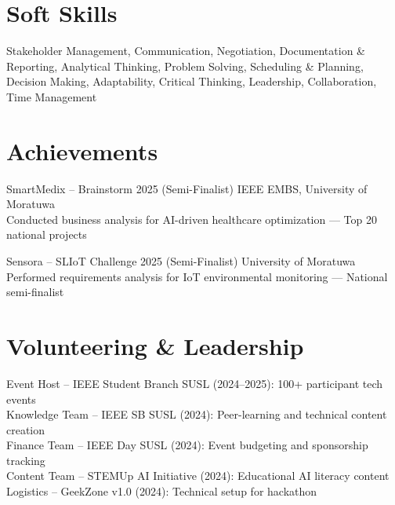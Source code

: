 \documentclass[letterpaper,12pt]{article}
\begin{document}
\section{Soft Skills}
\vspace{-1pt}
Stakeholder Management, Communication, Negotiation, Documentation \& Reporting, Analytical Thinking, Problem Solving, Scheduling \& Planning, Decision Making, Adaptability, Critical Thinking, Leadership, Collaboration, Time Management

\section{Achievements}
\vspace{-1pt}

SmartMedix – Brainstorm 2025 (Semi-Finalist) \hfill IEEE EMBS, University of Moratuwa\\
Conducted business analysis for AI-driven healthcare optimization — Top 20 national projects

\vspace{5pt}
\noindent Sensora – SLIoT Challenge 2025 (Semi-Finalist) \hfill University of Moratuwa\\
Performed requirements analysis for IoT environmental monitoring — National semi-finalist

\section{Volunteering \& Leadership}
\vspace{-1pt}
Event Host – IEEE Student Branch SUSL (2024–2025): 100+ participant tech events\\
Knowledge Team – IEEE SB SUSL (2024): Peer-learning and technical content creation\\
Finance Team – IEEE Day SUSL (2024): Event budgeting and sponsorship tracking\\
Content Team – STEMUp AI Initiative (2024): Educational AI literacy content\\
Logistics – GeekZone v1.0 (2024): Technical setup for hackathon

\vspace{-2pt}
\end{document}
